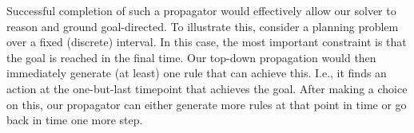 \documentclass[a4paper,11pt]{article}
\begin{document}
\begin{WP}
\begin{compactenum}
\begin{compactenum}
\end{compactenum}
Successful completion of such a propagator would effectively allow our solver to reason and ground goal-directed. To illustrate this, consider a planning problem over a fixed (discrete) interval. 
In this case, the most important constraint is that the goal is reached in the final time. 
Our top-down propagation would then immediately generate (at least) one rule that can achieve this. I.e., it finds an action at the one-but-last timepoint that achieves the goal. After making a choice on this, our propagator can either generate more rules at that point in time or go back in time one more step.  \qedhere
\end{compactenum}
% 
% 
% 
\end{WP}
\end{document}
